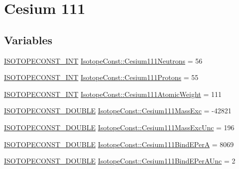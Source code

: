 \hypertarget{group___isotope_const-_cesium-_cs111}{}\section{Cesium 111}
\label{group___isotope_const-_cesium-_cs111}
\subsection*{Variables}
\begin{DoxyCompactItemize}
\item 
\mbox{\hyperlink{group___isotope_const-_macros_ga5f18360b3e99483a35c32d789e62621c}{I\+S\+O\+T\+O\+P\+E\+C\+O\+N\+S\+T\+\_\+\+I\+NT}} \mbox{\hyperlink{group___isotope_const-_cesium-_cs111_ga6928386daeb74ffafae24bc15bba2019}{Isotope\+Const\+::\+Cesium111\+Neutrons}} = 56
\item 
\mbox{\hyperlink{group___isotope_const-_macros_ga5f18360b3e99483a35c32d789e62621c}{I\+S\+O\+T\+O\+P\+E\+C\+O\+N\+S\+T\+\_\+\+I\+NT}} \mbox{\hyperlink{group___isotope_const-_cesium-_cs111_gafcf4dd62e198f810e8dcc4e460f96e5c}{Isotope\+Const\+::\+Cesium111\+Protons}} = 55
\item 
\mbox{\hyperlink{group___isotope_const-_macros_ga5f18360b3e99483a35c32d789e62621c}{I\+S\+O\+T\+O\+P\+E\+C\+O\+N\+S\+T\+\_\+\+I\+NT}} \mbox{\hyperlink{group___isotope_const-_cesium-_cs111_gaa7efb33336130368b90be9e977cc2e1a}{Isotope\+Const\+::\+Cesium111\+Atomic\+Weight}} = 111
\item 
\mbox{\hyperlink{group___isotope_const-_macros_ga8f45a7272ce02c0b4c65c44636ed719a}{I\+S\+O\+T\+O\+P\+E\+C\+O\+N\+S\+T\+\_\+\+D\+O\+U\+B\+LE}} \mbox{\hyperlink{group___isotope_const-_cesium-_cs111_gacf30156b38e465a3b9ea9bcf303f560d}{Isotope\+Const\+::\+Cesium111\+Mass\+Exc}} = -\/42821
\item 
\mbox{\hyperlink{group___isotope_const-_macros_ga8f45a7272ce02c0b4c65c44636ed719a}{I\+S\+O\+T\+O\+P\+E\+C\+O\+N\+S\+T\+\_\+\+D\+O\+U\+B\+LE}} \mbox{\hyperlink{group___isotope_const-_cesium-_cs111_ga65354649277f3979260923d87f8c39cc}{Isotope\+Const\+::\+Cesium111\+Mass\+Exc\+Unc}} = 196
\item 
\mbox{\hyperlink{group___isotope_const-_macros_ga8f45a7272ce02c0b4c65c44636ed719a}{I\+S\+O\+T\+O\+P\+E\+C\+O\+N\+S\+T\+\_\+\+D\+O\+U\+B\+LE}} \mbox{\hyperlink{group___isotope_const-_cesium-_cs111_ga6e437207f91f9042f9876f51be3a7fdd}{Isotope\+Const\+::\+Cesium111\+Bind\+E\+PerA}} = 8069
\item 
\mbox{\hyperlink{group___isotope_const-_macros_ga8f45a7272ce02c0b4c65c44636ed719a}{I\+S\+O\+T\+O\+P\+E\+C\+O\+N\+S\+T\+\_\+\+D\+O\+U\+B\+LE}} \mbox{\hyperlink{group___isotope_const-_cesium-_cs111_gac463de0e0e43b9980b090a99b8818691}{Isotope\+Const\+::\+Cesium111\+Bind\+E\+Per\+A\+Unc}} = 2

\end{DoxyCompactItemize}
